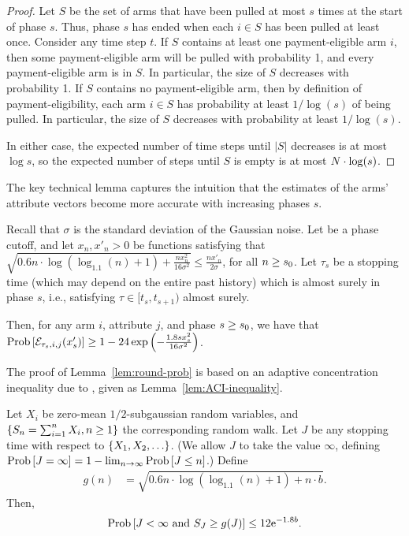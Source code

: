 \begin{proof}
Let $S$ be the set of arms that have been pulled at most
$s$ times at the start of phase $s$.
Thus, phase $s$ has ended when each $i \in S$ has been pulled at least once.
Consider any time step $t$.
If $S$ contains at least one payment-eligible arm $i$,
then some payment-eligible arm will be pulled with probability 1,
and every payment-eligible arm is in $S$.
In particular, the size of $S$ decreases with probability 1.
If $S$ contains no payment-eligible arm,
then by definition of payment-eligibility,
each arm $i \in S$ has probability at least $1/\log(s)$ of being pulled.
In particular, the size of $S$ decreases with probability at least $1/\log(s)$.

In either case, the expected number of time steps until
$|S|$ decreases is at most $\log s$,
so the expected number of steps until $S$ is empty is at most
$N \cdot \log(s)$.
\end{proof}
                  
The key technical lemma captures the intuition that
the estimates of the arms' attribute vectors become
more accurate with increasing phases $s$.

\begin{lemma} \label{lem:round-prob}
Recall that $\sigma$ is the standard deviation of the Gaussian noise.
Let \LatePhase be a phase cutoff, 
and let $x_n, x'_n > 0$ be functions satisfying that
$\sqrt{0.6 n \cdot \log (\log_{1.1}(n) + 1) + \frac{n x_n^2}{16 \sigma^2}}
\leq \frac{n x'_n}{2 \sigma}$,
for all $n \geq s_0$.
Let $\tau_s$ be a stopping time
(which may depend on the entire past history)
which is almost surely in phase $s$,
i.e., satisfying $\tau \in [t_s, t_{s+1})$ almost surely.

Then, for any arm $i$, attribute $j$, and phase $s \geq s_0$,
we have that
$\Prob{\AccE{\tau_s}{i}{j}{x'_s}}
\geq 1 - 24 \exp\left(-\frac{1.8 s x_s^2}{16 \sigma^2} \right)$.
\end{lemma}

The proof of Lemma~\ref{lem:round-prob} is based on an adaptive
concentration inequality due to \cite{zhao2016adaptive},
given as Lemma~\ref{lem:ACI-inequality}.

\begin{lemma}
\label{lem:ACI-inequality}
Let $X_i$ be zero-mean $1/2$-subgaussian random variables,
and $\{ S_n = \sum_{i=1}^n X_i, n \geq 1 \}$ the corresponding random walk.
Let $J$ be any stopping time with respect to $\{ X_1, X_2, \ldots \}$.
(We allow $J$ to take the value $\infty$,
defining $\Prob{J = \infty} = 1 - \lim_{n \to \infty} \Prob{J \leq n}$.)
Define 
\begin{align*}
g(n) & = \sqrt{0.6 n \cdot \log (\log_{1.1}(n) + 1) + n \cdot b}.
\end{align*}
Then, 
\begin{align*}
\Prob{J < \infty \mbox{ and } S_J \geq g(J)} \leq 12 \e^{-1.8 b}.
\end{align*}
\end{lemma}

